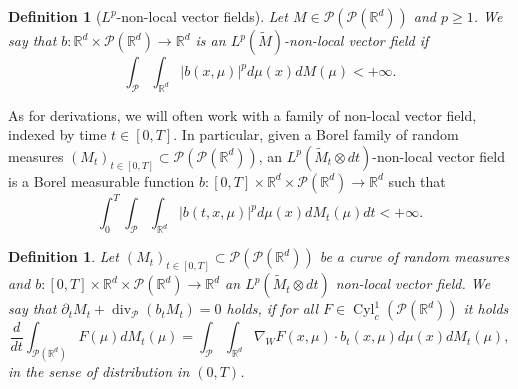 \documentclass[10pt,leqno]{amsart}
\numberwithin{equation}{section}
\newtheorem{df}[teorema]{Definition}
\newcommand{\R}{\mathbb{R}}
\newcommand{\PP}{\mathcal{P}}
\begin{document}
\begin{df}[$L^p$-non-local vector fields]\label{vf inducing derivation}
    Let $M\in\PP(\PP(\R^d))$ and $p\geq 1$. We say that $b:\R^d\times \PP(\R^d)\to \R^d$ is an $L^p(\widetilde{M})$-non-local vector field if 
    \begin{equation}
        \int_{\PP}\int_{\R^d} |b(x,\mu)|^p d\mu(x)dM(\mu)  <+\infty .
    \end{equation}
\end{df}

As for derivations, we will often work with a family of non-local vector field, indexed by time $t\in [0,T]$. In particular, given a Borel family of random measures $(M_t)_{t\in[0,T]}\subset \PP(\PP(\R^d))$, an $L^p(\widetilde{M}_t\otimes dt)$-non-local vector field is a Borel measurable function $b:[0,T]\times \R^d \times \PP(\R^d)\to \R^d$ such that 
\begin{equation}\label{time integrability for non-local vf}
    \int_0^T \int_{\PP}\int_{\R^d} |b(t,x,\mu)|^p d\mu(x) dM_t(\mu) dt<+\infty.
\end{equation}



\begin{df}\label{def CERM non-local vf}
    Let $(M_t)_{t\in [0,T]} \subset \PP(\PP(\R^d))$ be a curve of random measures and $b:[0,T]\times \R^d \times \PP(\R^d) \to \R^d$ an $L^p(\widetilde{M}_t\otimes dt)$ non-local vector field. We say that $\partial_t M_t + \operatorname{div}_\PP(b_tM_t) = 0$ holds, if for all $F \in \operatorname{Cyl}_c^1(\PP(\R^d))$ it holds
    \begin{equation}\label{cerm with non-local vf}
        \frac{d}{dt}\int_{\PP(\R^d)} F(\mu) dM_t(\mu) = \int_{\PP} \int_{\R^d} \nabla_W F(x,\mu) \cdot b_t(x,\mu) d\mu(x) dM_t(\mu),
    \end{equation}
    in the sense of distribution in $(0,T)$.
\end{df}
\end{document}
